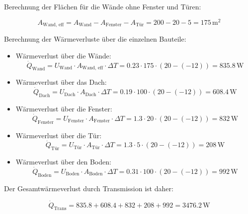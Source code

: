 Berechnung der Flächen für die Wände ohne Fenster und Türen:

\begin{equation}
A_\text{Wand, eff} = A_\text{Wand} - A_\text{Fenster} - A_\text{Tür} = 200 - 20 - 5 = 175 \, \text{m}^2
\end{equation}

Berechnung der Wärmeverluste über die einzelnen Bauteile:

\begin{itemize}
    \item Wärmeverlust über die Wände:
    \begin{equation}
    \dot{Q}_\text{Wand} = U_\text{Wand} \cdot A_\text{Wand, eff} \cdot \Delta T = 0.23 \cdot 175 \cdot (20 - (-12)) = 835.8 \, \text{W}
    \end{equation}
    
    \item Wärmeverlust über das Dach:
    \begin{equation}
    \dot{Q}_\text{Dach} = U_\text{Dach} \cdot A_\text{Dach} \cdot \Delta T = 0.19 \cdot 100 \cdot (20 - (-12)) = 608.4 \, \text{W}
    \end{equation}
    
    \item Wärmeverlust über die Fenster:
    \begin{equation}
    \dot{Q}_\text{Fenster} = U_\text{Fenster} \cdot A_\text{Fenster} \cdot \Delta T = 1.3 \cdot 20 \cdot (20 - (-12)) = 832 \, \text{W}
    \end{equation}
    
    \item Wärmeverlust über die Tür:
    \begin{equation}
    \dot{Q}_\text{Tür} = U_\text{Tür} \cdot A_\text{Tür} \cdot \Delta T = 1.3 \cdot 5 \cdot (20 - (-12)) = 208 \, \text{W}
    \end{equation}
    
    \item Wärmeverlust über den Boden:
    \begin{equation}
    \dot{Q}_\text{Boden} = U_\text{Boden} \cdot A_\text{Boden} \cdot \Delta T = 0.31 \cdot 100 \cdot (20 - (-12)) = 992 \, \text{W}
    \end{equation}
\end{itemize}

Der Gesamtwärmeverlust durch Transmission ist daher:

\begin{equation}
\dot{Q}_\text{Trans} = 835.8 + 608.4 + 832 + 208 + 992 = 3476.2 \, \text{W}
\end{equation}

